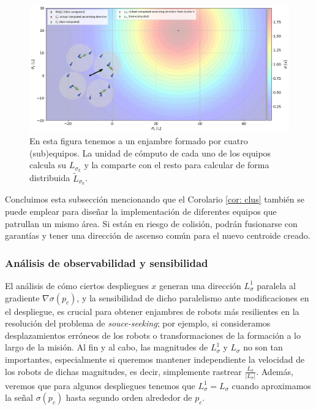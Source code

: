 \vspace{0.2cm}

\begin{figure}[!h]
\centering
\includegraphics[trim={0 0cm 0 0cm}, clip, width=1\columnwidth]{./fig/col_1.png}
\caption{En esta figura tenemos a un enjambre formado por cuatro (sub)equipos. La unidad de cómputo de cada uno de los equipos calcula su $L_{\sigma_k}$ y la comparte con el resto para calcular de forma distribuida $\tilde L_{\sigma_k}$.}
\label{fig: ss_col1}
\end{figure}

\newpage

Concluimos esta subsección mencionando que el Corolario \ref{cor: clus} también se puede emplear para diseñar la implementación de diferentes equipos que patrullan un mismo área. Si están en riesgo de colisión, podrán fusionarse con garantías y tener una dirección de ascenso común para el nuevo centroide creado.



\subsubsection{Análisis de observabilidad y sensibilidad}

El análisis de cómo ciertos despliegues $x$ generan una dirección $L^1_{\sigma}$ paralela al gradiente $\nabla \sigma(p_c)$, y la sensibilidad de dicho paralelismo ante modificaciones en el despliegue, es crucial para obtener enjambres de robots más resilientes en la resolución del problema de \textit{souce-seeking}; por ejemplo, si consideramos desplazamientos erróneos de los robots o transformaciones de la formación a lo largo de la misión. Al fin y al cabo, las magnitudes de $L^1_{\sigma}$ y $L_\sigma$ no son tan importantes, especialmente si queremos mantener independiente la velocidad de los robots de dichas magnitudes, es decir, simplemente rastrear $\frac{L_\sigma}{|L_\sigma|}$. Además, veremos que para algunos despliegues tenemos que $L^1_{\sigma} = L_\sigma$ cuando aproximamos la señal $\sigma(p_c)$ hasta segundo orden alrededor de $p_c$.

